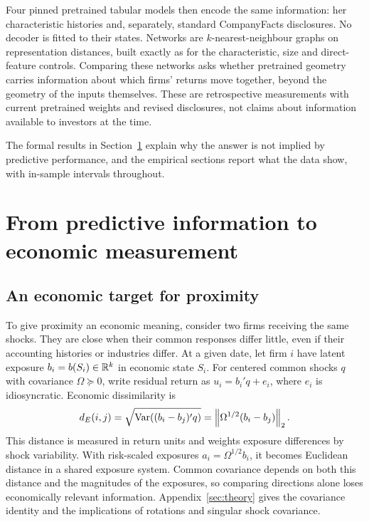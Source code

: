\documentclass[11pt]{article}
\begin{document}
Four pinned pretrained tabular models then encode the same information: her
characteristic histories and, separately, standard CompanyFacts disclosures. No
decoder is fitted to their states. Networks are $k$-nearest-neighbour graphs on
representation distances, built exactly as for the characteristic, size and
direct-feature controls. Comparing these networks asks whether pretrained
geometry carries information about which firms' returns move
together, beyond the
geometry of the inputs themselves. These are retrospective measurements with
current pretrained weights and revised disclosures, not claims about information
available to investors at the time.

The formal results in Section~\ref{sec:measurement} explain why the
answer is not
implied by predictive performance, and the empirical sections report what the
data show, with in-sample intervals throughout.

\section{From predictive information to economic
measurement}\label{sec:measurement}
\subsection{An economic target for proximity}
To give proximity an economic meaning, consider two firms receiving the same
shocks. They are close when their common responses differ little, even if their
accounting histories or industries differ. At a given date, let firm $i$ have
latent exposure $b_i=b(S_i)\in\mathbb{R}^k$ in economic state $S_i$. For centered common
shocks $q$ with covariance $\Omega\succeq0$, write residual return as
$u_i=b_i'q+e_i$, where $e_i$ is idiosyncratic. Economic dissimilarity is
\begin{equation}\label{eq:economic-distance}
  d_E(i,j)=\sqrt{\operatorname{Var}((b_i-b_j)'q)}
  =\left\lVert\Omega^{1/2}(b_i-b_j)\right\rVert_2.
\end{equation}
This distance is measured in return units and weights exposure differences by
shock variability. With risk-scaled exposures $a_i=\Omega^{1/2}b_i$, it becomes
Euclidean distance in a shared exposure system. Common covariance depends on
both this distance and the magnitudes of the exposures, so comparing directions
alone loses economically relevant information. Appendix~\ref{sec:theory} gives
the covariance identity and the implications of rotations and singular shock
covariance.
\end{document}
